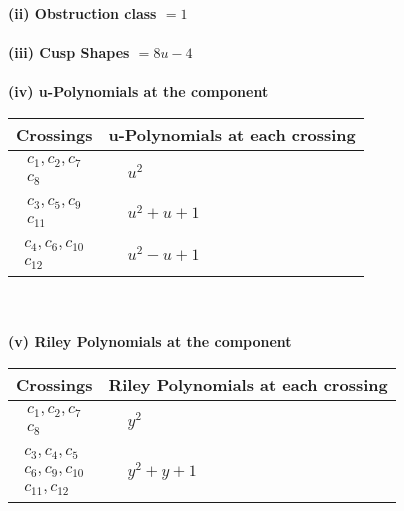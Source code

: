 \documentclass[1p]{elsarticle_modified}
\theoremstyle{definition}
\begin{document}
\flushleft \textbf{(ii) Obstruction class $= 1$}\\~\\
\flushleft \textbf{(iii) Cusp Shapes $= 8 u-4$}\\~\\
\newpage\renewcommand{\arraystretch}{1}
\flushleft \textbf{(iv) u-Polynomials at the component}\newline \\
\begin{tabular}{m{50pt}|m{274pt}}
Crossings & \hspace{64pt}u-Polynomials at each crossing \\
\hline $$\begin{aligned}c_{1},c_{2},c_{7}\\c_{8}\end{aligned}$$&$\begin{aligned}
&u^2
\end{aligned}$\\
\hline $$\begin{aligned}c_{3},c_{5},c_{9}\\c_{11}\end{aligned}$$&$\begin{aligned}
&u^2+u+1
\end{aligned}$\\
\hline $$\begin{aligned}c_{4},c_{6},c_{10}\\c_{12}\end{aligned}$$&$\begin{aligned}
&u^2- u+1
\end{aligned}$\\
\hline
\end{tabular}\\~\\
\newpage\renewcommand{\arraystretch}{1}
\flushleft \textbf{(v) Riley Polynomials at the component}\newline \\
\begin{tabular}{m{50pt}|m{274pt}}
Crossings & \hspace{64pt}Riley Polynomials at each crossing \\
\hline $$\begin{aligned}c_{1},c_{2},c_{7}\\c_{8}\end{aligned}$$&$\begin{aligned}
&y^2
\end{aligned}$\\
\hline $$\begin{aligned}c_{3},c_{4},c_{5}\\c_{6},c_{9},c_{10}\\c_{11},c_{12}\end{aligned}$$&$\begin{aligned}
&y^2+y+1
\end{aligned}$\\
\hline
\end{tabular}\\~\\
\end{document}
